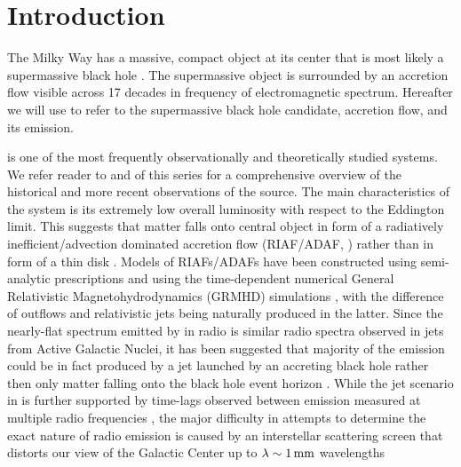\section{Introduction}
\label{sec:intro}

The Milky Way has a massive, compact object at its center that is most likely a supermassive black hole \citep{2019Sci...365..664D, 2019A&A...625L..10G}.
The supermassive object is surrounded by an accretion flow visible across 17 decades in frequency of electromagnetic spectrum.
Hereafter we will use \sgra to refer to the supermassive black hole candidate, accretion flow, and its emission.

\sgra is one of the most frequently observationally and theoretically studied systems.
We refer reader to  and  of this series for a comprehensive overview of the historical and more recent observations of the source.
The main characteristics of the \sgra system is its extremely low overall luminosity with respect to the Eddington limit.
This suggests that matter falls onto \sgra central object in form of a radiatively inefficient/advection dominated accretion flow (RIAF/ADAF, \citealt{1977ApJ...214..840I,1994ApJ...428L..13N, 1995ApJ...444..231N, 1995ApJ...452..710N, 1996A&AS..120C.287N, 1998ApJ...492..554N,2014ARA&A..52..529Y}) rather than in form of a thin disk \citep{1973A&A....24..337S}.
Models of RIAFs/ADAFs have been constructed using semi-analytic prescriptions \citep[e.g.,][]{1995Natur.374..623N,2000ApJ...541..234O, 2009ApJ...697...45B,2011ApJ...735..110B} and using the time-dependent numerical General Relativistic Magnetohydrodynamics (GRMHD) simulations \citep[e.g.,][]{2000ApJ...528..462H, 2003ApJ...589..458D, 2003ApJ...589..444G, 2007CQGra..24S.235G, 2012ApJS..201....9F, 2014ApJ...796...22F, 2016ApJS..225...22W, 2017ApJS..231...17A, 2018JPhCS1031a2008O, 2019A&A...629A..61O, 2019ApJS..243...26P}, with the difference of outflows and relativistic jets being naturally produced in the latter.
Since the nearly-flat spectrum emitted by \sgra in radio is similar radio spectra observed in jets from Active Galactic Nuclei, it has been suggested that majority of the \sgra emission could be in fact produced by a jet launched by an accreting black hole rather then only matter falling onto the black hole event horizon \citep{2000A&A...362..113F}.
While the jet scenario in \sgra is further supported by time-lags observed between emission measured at multiple radio frequencies \citep{2021arXiv210713402B}, the major difficulty in attempts to determine the exact nature of \sgra radio emission is caused by an interstellar scattering screen that distorts our view of the Galactic Center up to $\lambda \sim 1\,\mathrm{mm}$ wavelengths
